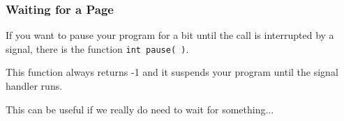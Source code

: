\begin{frame}
\frametitle{Waiting for a Page}

If you want to pause your program for a bit until the call is interrupted by a signal, there is the function \texttt{int pause( )}. 

This function always returns -1 and it suspends your program until the signal handler runs. 

This can be useful if we really do need to wait for something...

\end{frame}






